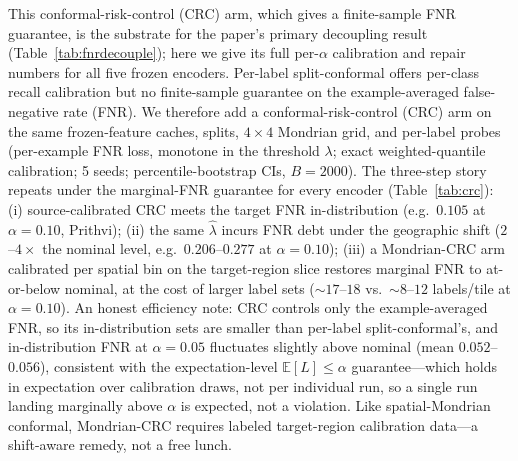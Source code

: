\documentclass[journal]{IEEEtran}
\renewcommand{\_}{\textunderscore\allowbreak}
\begin{document}
This conformal-risk-control (CRC) arm, which gives a finite-sample FNR guarantee, is the substrate for the
paper's primary decoupling result (Table~\ref{tab:fnrdecouple}); here we give its full per-$\alpha$
calibration and repair numbers for all five frozen encoders. Per-label split-conformal offers per-class
recall calibration but no finite-sample guarantee on the example-averaged false-negative rate (FNR). We
therefore add a conformal-risk-control (CRC) arm \citep{angelopoulos2024crc} on the same frozen-feature caches, splits,
$4\times4$ Mondrian grid, and per-label probes (per-example FNR loss, monotone in the threshold $\lambda$;
exact weighted-quantile calibration; 5 seeds; percentile-bootstrap CIs, $B{=}2000$). The three-step story
repeats under the marginal-FNR guarantee for every encoder (Table~\ref{tab:crc}): (i) source-calibrated CRC meets the
target FNR in-distribution (e.g.\ $0.105$ at $\alpha{=}0.10$, Prithvi); (ii) the same $\hat\lambda$ incurs
FNR debt under the geographic shift ($2$--$4\times$ the nominal level, e.g.\ $0.206$--$0.277$ at
$\alpha{=}0.10$); (iii) a Mondrian-CRC arm calibrated per spatial bin on the target-region slice restores
marginal FNR to at-or-below nominal, at the cost of larger label sets (${\sim}17$--$18$ vs.\
${\sim}8$--$12$ labels/tile at $\alpha{=}0.10$). An honest efficiency note: CRC controls only the
example-averaged FNR, so its in-distribution sets are smaller than per-label split-conformal's, and
in-distribution FNR at $\alpha{=}0.05$ fluctuates slightly above nominal (mean $0.052$--$0.056$), consistent
with the expectation-level $\mathbb{E}[L]\le\alpha$ guarantee---which holds in expectation over calibration
draws, not per individual run, so a single run landing marginally above $\alpha$ is expected, not a violation. Like spatial-Mondrian conformal, Mondrian-CRC
requires labeled target-region calibration data---a shift-aware remedy, not a free lunch.
\end{document}
